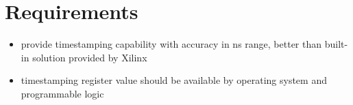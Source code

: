 \chapter{Requirements}

\begin{itemize}
    \item provide timestamping capability with accuracy in ns range, better than built-in solution provided by Xilinx
    \item timestamping register value should be available by operating system and programmable logic


\end{itemize}
